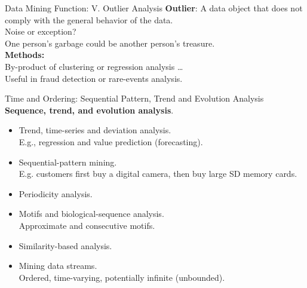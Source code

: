 \begin{frame}{Data Mining Function: V. Outlier Analysis}
	\textbf{Outlier}: A data object that does not comply with the general 
	behavior of the data.\\[0.5cm]
	
	Noise or exception?\\
	One person's garbage could be another person's treasure.\\[0.5cm]
	
	\textbf{Methods:}\\
	By-product of clustering or regression analysis \ldots \\
	Useful in fraud detection or rare-events analysis.
\end{frame}

\begin{frame}{Time and Ordering: Sequential Pattern, Trend and Evolution 
Analysis}
	\textbf{Sequence, trend, and evolution analysis}.\\
	\begin{itemize}
		\item Trend, time-series and deviation analysis. \\
		E.g., regression and value prediction (forecasting).
		\item Sequential-pattern mining.\\
		E.g. customers first buy a digital camera, then buy large SD memory 
		cards.
		\item Periodicity analysis.
		\item Motifs and biological-sequence analysis.\\
		Approximate and consecutive motifs.
		\item Similarity-based analysis.\\
		\item Mining data streams.\\
		Ordered, time-varying, potentially infinite (unbounded).
	\end{itemize}
\end{frame}

